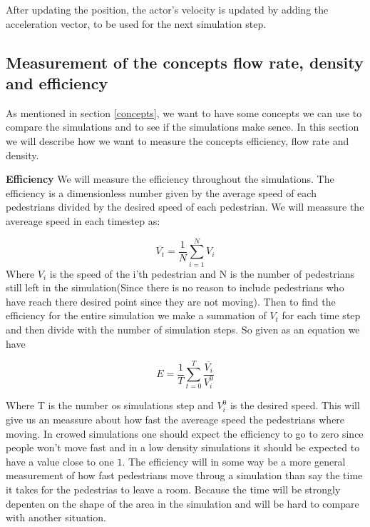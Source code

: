 After updating the position, the actor's velocity is updated by adding the 
acceleration vector, to be used for the next simulation step.

%
%
%
%
%
%
%

\subsection{Measurement of the concepts flow rate, density and efficiency}
As mentioned in section \ref{concepts}, we want to have some concepts we can use to compare
the simulations and to see if the simulations make sence.
In this section we will describe how we want to measure the concepts efficiency,
flow rate and density.

\textbf{Efficiency}
We will measure the efficiency throughout the simulations. The efficiency is a 
dimensionless number given by the average speed of each pedestrians divided by 
the desired speed of each pedestrian. We will meassure the avereage speed in each 
timestep as:

\begin{equation}
	\overline{V_t}=\frac{1}{N}\sum_{i=1}^{N}V_i
\end{equation}
Where $V_i$ is the speed of the i'th pedestrian and N is the number of pedestrians 
still left in the simulation(Since there is no reason to include pedestrians who have 
reach there desired point since they are not moving). Then to find the efficiency for 
the entire simulation we make a summation of $V_t$ for each time step and then divide 
with the number of simulation steps. So given as an equation we have

\begin{equation}
		E=\frac{1}{T}\sum_{t=0}^{T}\frac{\overline{V_i}}{V^0_{i}}
\end{equation}

Where T is the number os simulations step and $V^0_{i}$ is the desired speed. This will 
give us an meassure about how fast the avereage speed the pedestrians where moving. In 
crowed simulations one should expect the efficiency to go to zero since people won't move 
fast and in a low density simulations it should be expected to have a value close to one $1$. 
The efficiency will in some way be a more general measurement of how fast pedestrians move 
throug a simulation than say the time it takes for the pedestrias to leave a room. Because 
the time will be strongly depenten on the shape of the area in the simulation and will be 
hard to compare with another situation. 
	
